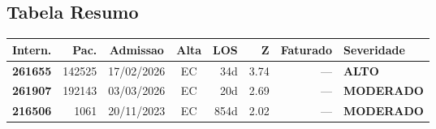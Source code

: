 \documentclass[a4paper,10pt]{article}
\begin{document}
\subsection{Tabela Resumo}
\begin{center}
\begin{longtable}{>{\scriptsize}r>{\scriptsize}r>{\scriptsize}c>{\scriptsize}c>{\scriptsize}r>{\scriptsize}r>{\scriptsize}r>{\scriptsize}l}
\toprule
\textbf{Intern.} & \textbf{Pac.} & \textbf{Admissao} & \textbf{Alta} & \textbf{LOS} & \textbf{Z} & \textbf{Faturado} & \textbf{Severidade} \\
\midrule
\endhead
\bottomrule
\endfoot

\textcolor{anomorange}{\textbf{261655}} & 142525 & 17/02/2026 & \textcolor{anomorange}{EC} & 34d & \textcolor{anomorange}{3.74} & --- & \textcolor{anomorange}{\textbf{ALTO}} \\

\textcolor{anomyellow}{\textbf{261907}} & 192143 & 03/03/2026 & \textcolor{anomorange}{EC} & 20d & \textcolor{anomyellow}{2.69} & --- & \textcolor{anomyellow}{\textbf{MODERADO}} \\

\textcolor{anomyellow}{\textbf{216506}} & 1061 & 20/11/2023 & \textcolor{anomorange}{EC} & 854d & \textcolor{anomyellow}{2.02} & --- & \textcolor{anomyellow}{\textbf{MODERADO}} \\

\end{longtable}\end{center}
\end{document}

